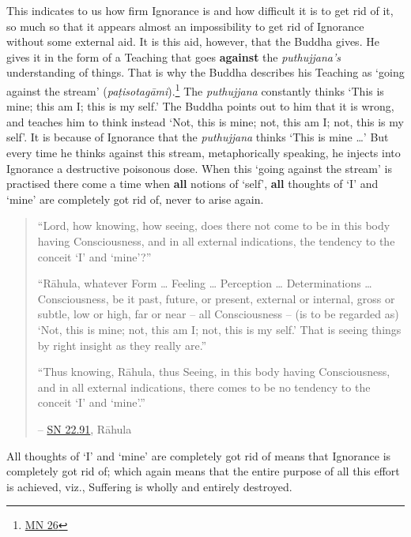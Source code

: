 This indicates to us how firm Ignorance is and how difficult it is to get rid of it, so much so that it appears almost an impossibility to get rid of Ignorance without some external aid. It is this aid, however, that the Buddha gives. He gives it in the form of a Teaching that goes \textbf{against} the \emph{puthujjana's} understanding of things. That is why the Buddha describes his Teaching as `going against the stream' (\emph{paṭisotagāmi}).\footnote{\href{https://suttacentral.net/mn26/en/bodhi}{MN 26}} The \emph{puthujjana} constantly thinks `This is mine; this am I; this is my self.' The Buddha points out to him that it is wrong, and teaches him to think instead `Not, this is mine; not, this am I; not, this is my self'. It is because of Ignorance that the \emph{puthujjana} thinks `This is mine \ldots\hspace{0pt}' But every time he thinks against this stream, metaphorically speaking, he injects into Ignorance a destructive poisonous dose. When this `going against the stream' is practised there come a time when \textbf{all} notions of `self', \textbf{all} thoughts of `I' and `mine' are completely got rid of, never to arise again.

\begin{quote}
``Lord, how knowing, how seeing, does there not come to be in this body having Consciousness, and in all external indications, the tendency to the conceit `I' and `mine'?''

``Rāhula, whatever Form \ldots\hspace{0pt} Feeling \ldots\hspace{0pt} Perception \ldots\hspace{0pt} Determinations \ldots\hspace{0pt} Consciousness, be it past, future, or present, external or internal, gross or subtle, low or high, far or near -- all Consciousness -- (is to be regarded as) `Not, this is mine; not, this am I; not, this is my self.' That is seeing things by right insight as they really are.''

``Thus knowing, Rāhula, thus Seeing, in this body having Consciousness, and in all external indications, there comes to be no tendency to the conceit `I' and `mine'.''

 -- \href{https://suttacentral.net/sn22.91/en/bodhi}{SN 22.91}, Rāhula
\end{quote}

All thoughts of `I' and `mine' are completely got rid of means that Ignorance is completely got rid of; which again means that the entire purpose of all this effort is achieved, viz., Suffering is wholly and entirely destroyed.

